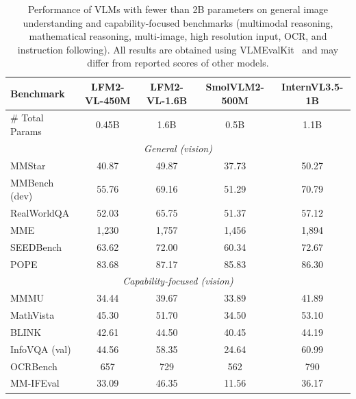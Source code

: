 \documentclass{article}
\begin{document}
\begin{table}[tb]
\centering
\small
\begin{tabular}{lcccc}
\toprule
\textbf{Benchmark} & \textbf{LFM2-VL-450M} & \textbf{LFM2-VL-1.6B} & \textbf{SmolVLM2-500M} & \textbf{InternVL3.5-1B} \\
\midrule
\# Total Params  & 0.45B & 1.6B & 0.5B & 1.1B  \\
\midrule
\multicolumn{5}{c}{\textit{General (vision)}} \\
\midrule
MMStar           & 40.87    & 49.87  & 37.73    & 50.27    \\
MMBench (dev)    & 55.76    & 69.16  & 51.29    & 70.79    \\
RealWorldQA      & 52.03    & 65.75  & 51.37    & 57.12    \\
MME              & 1,230 & 1,757 & 1,456 & 1,894 \\
SEEDBench        & 63.62    & 72.00  & 60.34    & 72.67    \\
POPE             & 83.68    & 87.17  & 85.83    & 86.30    \\
\midrule
\multicolumn{5}{c}{\textit{Capability-focused (vision)}} \\
\midrule
MMMU             & 34.44  & 39.67  & 33.89  & 41.89  \\
MathVista        & 45.30  & 51.70  & 34.50  & 53.10  \\
BLINK            & 42.61  & 44.50  & 40.45  & 44.19  \\
InfoVQA (val)    & 44.56  & 58.35  & 24.64  & 60.99  \\
OCRBench         & 657 & 729 & 562 & 790 \\
MM-IFEval        & 33.09  & 46.35  & 11.56  & 36.17  \\
\bottomrule
\end{tabular}
\caption{Performance of VLMs with fewer than 2B parameters on general image understanding and capability-focused benchmarks (multimodal reasoning, mathematical reasoning, multi-image, high resolution input, OCR, and instruction following). All results are obtained using VLMEvalKit~\citep{duan2025vlmevalkitopensourcetoolkitevaluating} and may differ from reported scores of other models.}
\label{tab:vl-general}
\end{table}
\end{document}
